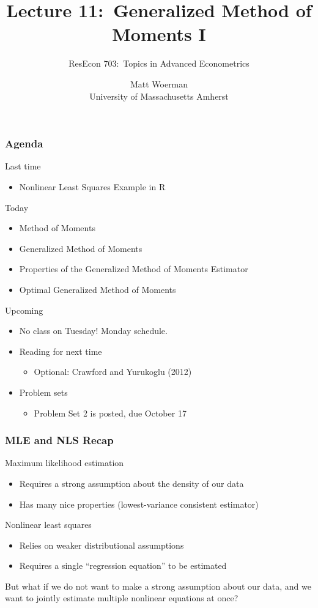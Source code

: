 \documentclass{beamer}
\title[Lecture 11:\ Generalized Method of Moments I]{Lecture 11:\ Generalized Method of Moments I}
\author[ResEcon 703:\ Advanced Econometrics]{ResEcon 703:\ Topics in Advanced Econometrics}
\date{Matt Woerman\\University of Massachusetts Amherst}
\begin{document}
{ 
\begin{frame}[noframenumbering]
    \titlepage
\end{frame}
}

\begin{frame}\frametitle{Agenda}
    Last time
    \begin{itemize}
        \item Nonlinear Least Squares Example in R
    \end{itemize}
    \vspace{2ex}
    Today
    \begin{itemize}
    	\item Method of Moments
    	\item Generalized Method of Moments
    	\item Properties of the Generalized Method of Moments Estimator
    	\item Optimal Generalized Method of Moments
    \end{itemize}
    \vspace{2ex}
    Upcoming
    \begin{itemize}
    	\item No class on Tuesday! Monday schedule.
        \item Reading for next time
        \begin{itemize}
            \item Optional: Crawford and Yurukoglu (2012)
        \end{itemize}
        \item Problem sets
        \begin{itemize}
            \item Problem Set 2 is posted, due October 17
        \end{itemize}
    \end{itemize}
\end{frame}

\begin{frame}\frametitle{MLE and NLS Recap}
    Maximum likelihood estimation
    \begin{itemize}
    	\item Requires a strong assumption about the density of our data
    	\item Has many nice properties (lowest-variance consistent estimator)
    \end{itemize}
    \vspace{3ex}
    Nonlinear least squares
    \begin{itemize}
    	\item Relies on weaker distributional assumptions
    	\item Requires a single ``regression equation'' to be estimated
    \end{itemize}
    \vspace{3ex}
    But what if we do not want to make a strong assumption about our data, and we want to jointly estimate multiple nonlinear equations at once?
\end{frame}
\end{document}
